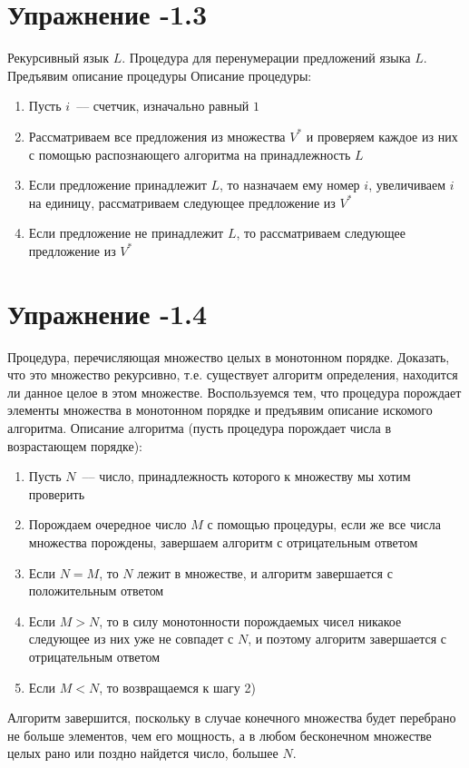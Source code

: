 \documentclass[12pt, a4paper, oneside]{memoir}
\begin{document}
\section*{Упражнение -1.3}
\begin{solution}
    {Рекурсивный язык $L$.}
    {Процедура для перенумерации предложений языка $L$.}
    {Предъявим описание процедуры}
    Описание процедуры:

    \begin{enumerate}
        \item Пусть $i$~--– счетчик, изначально равный $1$
        \item Рассматриваем все предложения из множества $V^*$ и проверяем каждое из них с помощью распознающего алгоритма на принадлежность $L$
        \item Если предложение принадлежит $L$, то назначаем ему номер $i$, увеличиваем $i$ на единицу, рассматриваем следующее предложение из $V^*$
        \item Если предложение не принадлежит $L$, то рассматриваем следующее предложение из $V^*$
    \end{enumerate}
\end{solution}
\section*{Упражнение -1.4}
\begin{solution}
    {Процедура, перечисляющая множество целых в монотонном порядке.}
    {Доказать, что это множество рекурсивно, т.е. существует алгоритм определения, находится ли данное целое в этом множестве.}
    {Воспользуемся тем, что процедура порождает элементы множества в монотонном порядке и предъявим описание искомого алгоритма.}
    Описание алгоритма (пусть процедура порождает числа в возрастающем
    порядке):
    \begin{enumerate}
        \item Пусть $N$~--– число, принадлежность которого к множеству мы хотим проверить
        \item Порождаем очередное число $M$ с помощью процедуры, если же все числа множества порождены, завершаем алгоритм с отрицательным ответом
        \item Если $N = M$, то $N$ лежит в множестве, и алгоритм завершается с  положительным ответом
        \item Если $M > N$, то в силу монотонности порождаемых чисел никакое следующее из них уже не совпадет с $N$, и поэтому алгоритм завершается с отрицательным ответом
        \item Если  $M < N$, то возвращаемся к шагу 2)
    \end{enumerate}
    Алгоритм завершится, поскольку в случае конечного множества будет перебрано не больше элементов, чем его мощность, а в любом бесконечном множестве целых рано или поздно найдется число, большее $N$.
\end{solution}
\end{document}
